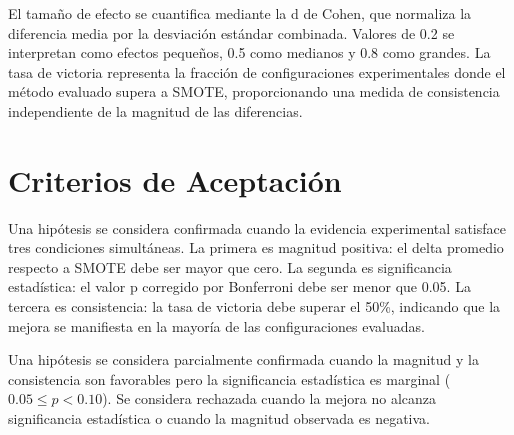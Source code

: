 El tamaño de efecto se cuantifica mediante la d de Cohen, que normaliza la diferencia media por la desviación estándar combinada. Valores de 0.2 se interpretan como efectos pequeños, 0.5 como medianos y 0.8 como grandes. La tasa de victoria representa la fracción de configuraciones experimentales donde el método evaluado supera a SMOTE, proporcionando una medida de consistencia independiente de la magnitud de las diferencias.

\section{Criterios de Aceptación}
\label{sec:criterios_aceptacion}

Una hipótesis se considera confirmada cuando la evidencia experimental satisface tres condiciones simultáneas. La primera es magnitud positiva: el delta promedio respecto a SMOTE debe ser mayor que cero. La segunda es significancia estadística: el valor p corregido por Bonferroni debe ser menor que 0.05. La tercera es consistencia: la tasa de victoria debe superar el 50\%, indicando que la mejora se manifiesta en la mayoría de las configuraciones evaluadas.

Una hipótesis se considera parcialmente confirmada cuando la magnitud y la consistencia son favorables pero la significancia estadística es marginal ($0.05 \leq p < 0.10$). Se considera rechazada cuando la mejora no alcanza significancia estadística o cuando la magnitud observada es negativa.
